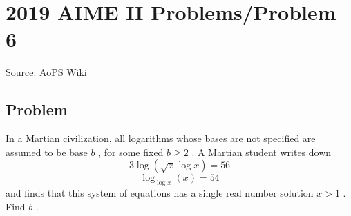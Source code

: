 \documentclass[12pt]{article}
\begin{document}
\section*{{2019 AIME II Problems/Problem 6}}
Source: AoPS Wiki

\subsection*{Problem}
In a Martian civilization, all logarithms whose bases are not specified are assumed to be base $b$ , for some fixed $b\ge2$ . A Martian student writes down \[3\log(\sqrt{x}\log x)=56\] \[\log_{\log x}(x)=54\] and finds that this system of equations has a single real number solution $x>1$ . Find $b$ .
\end{document}
